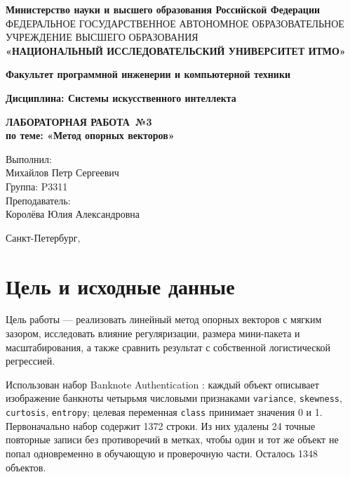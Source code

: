 \documentclass[a4paper,12pt]{article}
\newcommand{\LabSubject}{Системы искусственного интеллекта}
\newcommand{\LabWorkType}{ЛАБОРАТОРНАЯ РАБОТА}
\newcommand{\LabNumber}{3}
\newcommand{\LabTopic}{Метод опорных векторов}
\newcommand{\LabAuthor}{Михайлов Петр Сергеевич}
\newcommand{\LabGroup}{P3311}
\newcommand{\LabTeacher}{Королёва Юлия Александровна}
\newcommand{\LabYear}{\the\year}
\begin{document}
\begin{titlepage}
\centering
{\fontsize{11}{13}\selectfont\textbf{Министерство науки и высшего образования Российской Федерации}}\\
{\fontsize{7}{10}\selectfont ФЕДЕРАЛЬНОЕ ГОСУДАРСТВЕННОЕ АВТОНОМНОЕ ОБРАЗОВАТЕЛЬНОЕ УЧРЕЖДЕНИЕ ВЫСШЕГО ОБРАЗОВАНИЯ}\\
\vspace{.2cm}
{\fontsize{14}{17}\selectfont\textbf{«НАЦИОНАЛЬНЫЙ ИССЛЕДОВАТЕЛЬСКИЙ УНИВЕРСИТЕТ ИТМО»}}
\vspace{1cm}

{\fontsize{12}{14}\selectfont\textbf{Факультет программной инженерии и компьютерной техники}}
\vspace{1cm}

{\fontsize{12}{14}\selectfont\textbf{Дисциплина: \LabSubject}}
\vspace*{\fill}

{\fontsize{18}{22}\selectfont\textbf{\LabWorkType\ №\LabNumber}}\\
\vspace{.5cm}
{\fontsize{14}{17}\selectfont\textbf{по теме: «\LabTopic»}}
\vspace{1.5cm}

\begin{flushright}
\fontsize{12}{14}\selectfont
Выполнил:\\
\LabAuthor\\
Группа: \LabGroup\\[1em]
Преподаватель:\\
\LabTeacher
\end{flushright}
\vfill
{\fontsize{12}{14}\selectfont Санкт-Петербург, \LabYear}
\end{titlepage}
\setcounter{page}{2}
{\small\setlength{\parskip}{0pt}\tableofcontents}
\newpage

\section{Цель и исходные данные}
Цель работы — реализовать линейный метод опорных векторов с мягким зазором, исследовать влияние регуляризации, размера мини-пакета и масштабирования, а также сравнить результат с собственной логистической регрессией.

Использован набор Banknote Authentication \cite{uci}: каждый объект описывает изображение банкноты четырьмя числовыми признаками \texttt{variance}, \texttt{skewness}, \texttt{curtosis}, \texttt{entropy}; целевая переменная \texttt{class} принимает значения 0 и 1. Первоначально набор содержит 1372 строки. Из них удалены 24 точные повторные записи без противоречий в метках, чтобы один и тот же объект не попал одновременно в обучающую и проверочную части. Осталось 1348 объектов.
\end{document}
